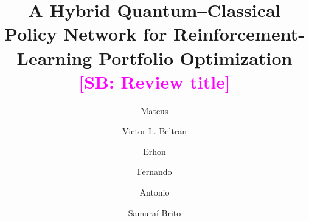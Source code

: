 \documentclass[aps,floatfix,superscriptaddress,twocolumn,tightenlines,amsmath,amssymb,nofootinbib,10pt,longbibliography,prl]{revtex4-2}
\newcommand{\sam}[1]{\textcolor{magenta}{[SB: {#1}]}}
\begin{document}
\title{A Hybrid Quantum–Classical Policy Network for Reinforcement-Learning Portfolio Optimization \sam{Review title}}


\author{Mateus}

\author{Victor L. Beltran}


\author{Erhon}

\author{Fernando}

\author{Antonio }

\author{Samuraí Brito}


\end{document}
